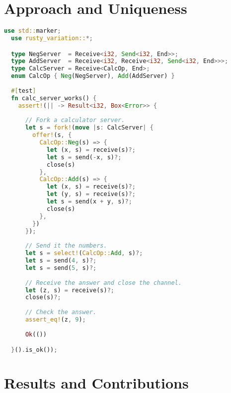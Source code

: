 \documentclass[a4paper,parskip=never,UKenglish]{scrartcl}
\begin{document}
\section{Approach and Uniqueness}
\begin{lstlisting}[language=Rust, style=boxed]
  use std::marker;
  use rusty_variation::*;

  type NegServer  = Receive<i32, Send<i32, End>>;
  type AddServer  = Receive<i32, Receive<i32, Send<i32, End>>>;
  type CalcServer = Receive<CalcOp, End>;
  enum CalcOp { Neg(NegServer), Add(AddServer) }
  
  #[test]
  fn calc_server_works() {  
    assert!(|| -> Result<i32, Box<Error>> {
      
      // Fork a calculator server.
      let s = fork!(move |s: CalcServer| {
        offer!(s, {
          CalcOp::Neg(s) => {
            let (x, s) = receive(s)?;
            let s = send(-x, s)?;
            close(s)
          },
          CalcOp::Add(s) => {
            let (x, s) = receive(s)?;
            let (y, s) = receive(s)?;
            let s = send(x + y, s)?;
            close(s)
          },
        })
      });
         
      // Send it the numbers. 
      let s = select!(CalcOp::Add, s)?;
      let s = send(4, s)?;
      let s = send(5, s)?;
        
      // Receive the answer and close the channel.
      let (z, s) = receive(s)?;
      close(s)?;
        
      // Check the answer.
      assert_eq!(z, 9);
        
      Ok(())

  }().is_ok());  
\end{lstlisting}

\section{Results and Contributions}

\clearpage
\printbibliography
\end{document}
